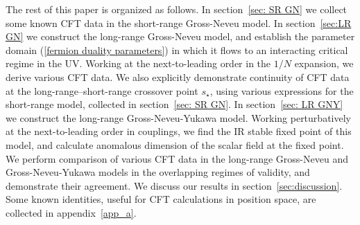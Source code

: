 \documentclass[aps,amsmath,amssymb,prd,showpacs,floatfix,preprint,superscriptaddress,nofootinbib,12pt]{article}
\begin{document}
The rest of this paper is organized as follows.
In section~\ref{sec: SR GN} we collect some known CFT data in the
short-range Gross-Neveu model. 
In section~\ref{sec:LR GN} we construct the long-range Gross-Neveu model, and establish the
parameter domain (\ref{fermion duality parameters}) in which it flows to an interacting critical regime in the UV.
Working at the next-to-leading order in the $1/N$ expansion, we derive various CFT data.
We also explicitly demonstrate continuity of
CFT data at the long-range--short-range crossover point $s_\star$, using various
expressions for the short-range model, collected in section~\ref{sec: SR GN}.
In section~\ref{sec: LR GNY} we construct the long-range Gross-Neveu-Yukawa model.
Working perturbatively at the next-to-leading order in couplings, we find the IR stable fixed point
of this model, and calculate anomalous dimension of the scalar field at the fixed point.
We perform comparison of various CFT data in the long-range Gross-Neveu and
Gross-Neveu-Yukawa models in the overlapping regimes of validity, and demonstrate their agreement.
We discuss our results in section~\ref{sec:discussion}. Some known identities,
useful for CFT calculations in position space, are collected in appendix~\ref{app_a}.
\end{document}
